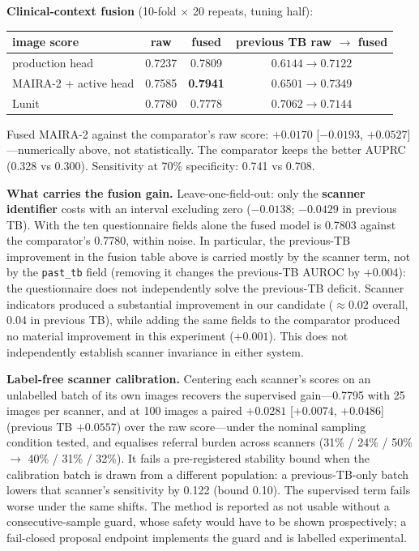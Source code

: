 \documentclass[12pt,a4paper]{report}
\newcommand{\ci}[2]{[$#1$, $#2$]}
\newcommand{\code}[1]{\texttt{#1}}
\begin{document}
\textbf{Clinical-context fusion} (10-fold $\times$ 20 repeats, tuning half):
\begin{center}\begin{tabular}{@{}lccc@{}}\toprule
image score & raw & fused & previous TB raw $\to$ fused\\\midrule
production head & 0.7237 & 0.7809 & $0.6144 \to 0.7122$\\
MAIRA-2 + active head & 0.7585 & \textbf{0.7941} & $0.6501 \to 0.7349$\\
Lunit & 0.7780 & 0.7778 & $0.7062 \to 0.7144$\\\bottomrule
\end{tabular}\end{center}
Fused MAIRA-2 against the comparator's raw score: $+0.0170$ \ci{-0.0193}{+0.0527}---numerically above, not statistically. The comparator keeps the better AUPRC (0.328 vs 0.300). Sensitivity at 70\% specificity: 0.741 vs 0.708.

\textbf{What carries the fusion gain.} Leave-one-field-out: only the \textbf{scanner identifier} costs with an interval excluding zero ($-0.0138$; $-0.0429$ in previous TB). With the ten questionnaire fields alone the fused model is 0.7803 against the comparator's 0.7780, within noise. In particular, the previous-TB improvement in the fusion table above is carried mostly by the scanner term, not by the \code{past\_tb} field (removing it changes the previous-TB AUROC by $+0.004$): the questionnaire does not independently solve the previous-TB deficit. Scanner indicators produced a substantial improvement in our candidate ($\approx 0.02$ overall, 0.04 in previous TB), while adding the same fields to the comparator produced no material improvement in this experiment ($+0.001$). This does not independently establish scanner invariance in either system.

\textbf{Label-free scanner calibration.} Centering each scanner's scores on an unlabelled batch of its own images recovers the supervised gain---0.7795 with 25 images per scanner, and at 100 images a paired $+0.0281$ \ci{+0.0074}{+0.0486} (previous TB $+0.0557$) over the raw score---under the nominal sampling condition tested, and equalises referral burden across scanners (31\% / 24\% / 50\% $\to$ 40\% / 31\% / 32\%). It fails a pre-registered stability bound when the calibration batch is drawn from a different population: a previous-TB-only batch lowers that scanner's sensitivity by 0.122 (bound 0.10). The supervised term fails worse under the same shifts. The method is reported as not usable without a consecutive-sample guard, whose safety would have to be shown prospectively; a fail-closed proposal endpoint implements the guard and is labelled experimental.
\end{document}
